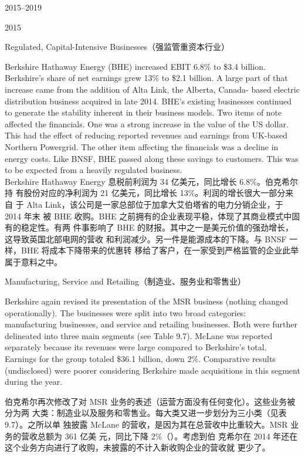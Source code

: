 \begin{chapter}{2015--2019}
\begin{section}{2015}
\begin{subsection}{Regulated, Capital-Intensive Businesses（强监管重资本行业）}
\begin{verseparallel}
  {
    Berkshire Hathaway Energy (BHE) increased EBIT 6.8\% to \$3.4 billion.
    Berkshire's share of net earnings grew 13\% to \$2.1 billion. A large part
    of that increase came from the addition of Alta Link, the Alberta, Canada-
    based electric distribution business acquired in late 2014. BHE's existing
    businesses continued to generate the stability inherent in their business
    models. Two items of note affected the financials. One was a strong increase
    in the value of the US dollar. This had the effect of reducing reported
    revenues and earnings from UK-based Northern Powergrid. The other item
    affecting the financials was a decline in energy costs. Like BNSF, BHE
    passed along these savings to customers. This was to be expected from a
    heavily regulated business. \\
  }
  {
    Berkshire Hathaway Energy 息税前利润为 34 亿美元，同比增长 6.8\%。伯克希尔持
    有股份对应的净利润为 21 亿美元，同比增长 13\%。利润的增长很大一部分来自
    于 Alta Link，该公司是一家总部位于加拿大艾伯塔省的电力分销企业，于 2014 年末
    被 BHE 收购。BHE 之前拥有的企业表现平稳，体现了其商业模式中固有的稳定性。有两
    件事影响了 BHE 的财报。其中之一是美元价值的强劲增长，这导致英国北部电网的营收
    和利润减少。另一件是能源成本的下降。与 BNSF 一样，BHE 将成本下降带来的优惠转
    移给了客户，在一家受到严格监管的企业此举属于意料之中。
  }
\end{verseparallel}
\end{subsection}

\begin{subsection}{Manufacturing, Service and Retailing（制造业、服务业和零售业）}

\begin{verseparallel}
  {

    Berkshire again revised its presentation of the MSR business (nothing
    changed operationally). The businesses were split into two broad categories:
    manufacturing businesses, and service and retailing businesses. Both were
    further delineated into three main segments (see Table 9.7). McLane was
    reported separately because its revenues were large compared to Berkshire's
    total. Earnings for the group totaled \$36.1 billion, down 2\%. Comparative
    results (undisclosed) were poorer considering Berkshire made acquisitions in
    this segment during the year. \\
  }
  {
    伯克希尔再次修改了对 MSR 业务的表述（运营方面没有任何变化）。这些业务被分为两
    大类：制造业以及服务和零售业。每大类又进一步划分为三小类（见表9.7）。之所以单
    独披露 McLane 的营收，是因为其在总营收中比重较大。MSR 业务的营收总额为 361 亿美
    元，同比下降 2\%（{\color{red}{这里原文有误，应为营收，而非利润}}）。考虑到伯
    克希尔在 2014 年还在这个业务方向进行了收购，未披露的不计入新收购企业的营收就
    更少了。
  }
\end{verseparallel}


\end{subsection}
\end{section}
\end{chapter}
